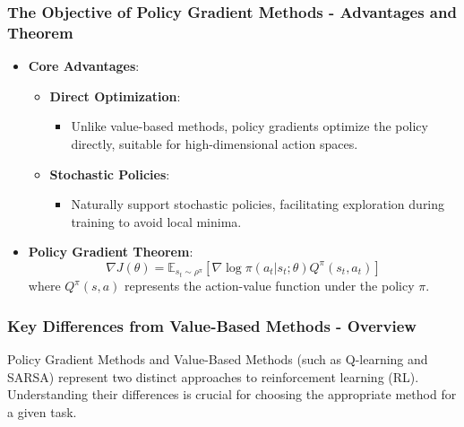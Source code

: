 \documentclass{beamer}
\begin{document}
\begin{frame}[fragile]
    \frametitle{The Objective of Policy Gradient Methods - Advantages and Theorem}
    \begin{itemize}
        \item \textbf{Core Advantages}:
        \begin{itemize}
            \item \textbf{Direct Optimization}:
            \begin{itemize}
                \item Unlike value-based methods, policy gradients optimize the policy directly, suitable for high-dimensional action spaces.
            \end{itemize}
            \item \textbf{Stochastic Policies}:
            \begin{itemize}
                \item Naturally support stochastic policies, facilitating exploration during training to avoid local minima.
            \end{itemize}
        \end{itemize}

        \item \textbf{Policy Gradient Theorem}:
        \begin{equation}
            \nabla J(\theta) = \mathbb{E}_{s_t \sim \rho^{\pi}} \left[ \nabla \log \pi(a_t|s_t; \theta) Q^{\pi}(s_t, a_t) \right]
        \end{equation}
        where $Q^{\pi}(s, a)$ represents the action-value function under the policy $\pi$.
    \end{itemize}
\end{frame}

\begin{frame}[fragile]
    \frametitle{Key Differences from Value-Based Methods - Overview}
    Policy Gradient Methods and Value-Based Methods (such as Q-learning and SARSA) represent two distinct approaches to reinforcement learning (RL). Understanding their differences is crucial for choosing the appropriate method for a given task.
\end{frame}
\end{document}
